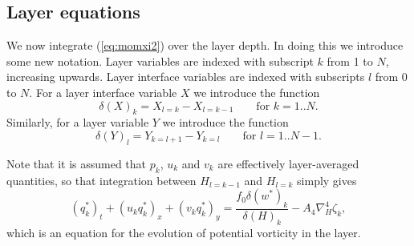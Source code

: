 \documentclass[11pt, a4paper,twoside]{article}
\numberwithin{equation}{section}
\begin{document}
\subsection{Layer equations}
We now integrate (\ref{eq:momxi2}) over the layer depth.
In doing this we introduce some new notation.
Layer variables are indexed with subscript $k$ from 1 to $N$, increasing upwards.
Layer interface variables are indexed with subscripts $l$ from 0 to $N$.
For a layer interface variable $X$ we introduce the function
\begin{equation}
\delta(X)_k = X_{l=k} - X_{l=k-1} \quad \quad \textrm{for }k = 1..N.
\end{equation}
Similarly, for a layer variable $Y$ we introduce the function
\begin{equation}
\delta(Y)_l = Y_{k=l+1} - Y_{k=l} \quad \quad \textrm{for }l = 1..N-1.
\end{equation}

Note that it is assumed that $p_k$, $u_k$ and $v_k$ are effectively layer-averaged quantities, so that integration between $H_{l=k-1}$ and $H_{l=k}$ simply gives
\begin{equation}\label{eq:momq}
\left(q^*_k\right)_t  + \left(u_k q^*_k \right)_x  + \left(v_kq^*_k\right)_y  = \frac{f_0 \delta(w^*)_k}{\delta(H)_k} - A_4\nabla_H^4\zeta_k,
\end{equation}
which is an equation for the evolution of potential vorticity in the layer.
\end{document}
